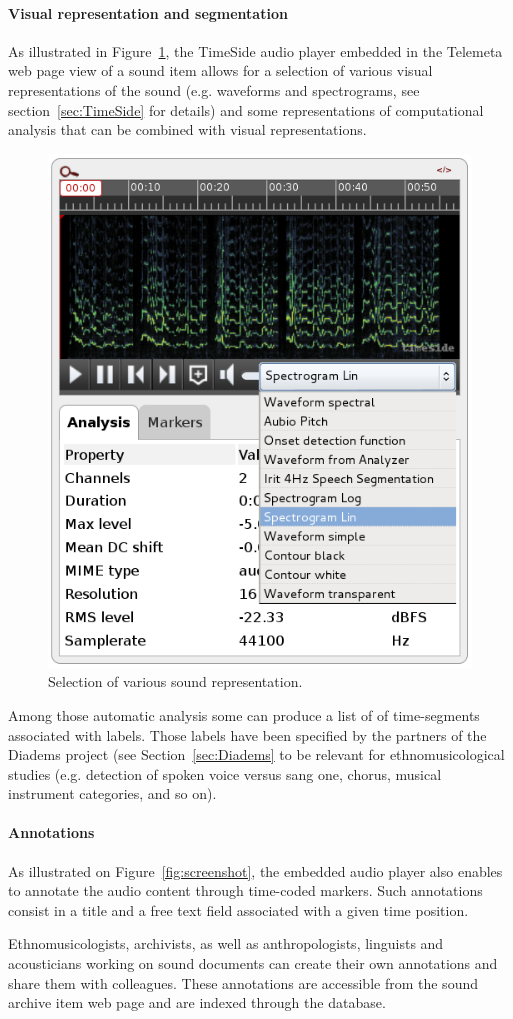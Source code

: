 \documentclass{sig-alternate}
\newcommand{\squeezeup}{\vspace{-2.5mm}}
\begin{document}
\squeezeup\paragraph{Visual representation and segmentation}
As illustrated in Figure~\ref{fig:sound_representation}, the TimeSide audio player embedded in the Telemeta web page view of a sound item allows for a selection of various visual representations of the sound (e.g. waveforms and spectrograms, see section~\ref{sec:TimeSide} for details) and some representations of computational analysis that can be combined with visual representations.
\begin{figure}[htb]
  \centering
  \includegraphics[width=0.5\linewidth]{img/sound_representation.png}
  \caption{Selection of various sound representation.}
  \label{fig:sound_representation}
\end{figure}
Among those automatic analysis some can produce a list of of time-segments associated with labels.
Those labels have been specified by the partners of the Diadems project (see Section~\ref{sec:Diadems} to be relevant for ethnomusicological studies (e.g. detection of spoken voice versus sang one, chorus, musical instrument categories, and so on).

\squeezeup\paragraph{Annotations}
As illustrated on Figure~\ref{fig:screenshot}, the embedded audio player also enables to annotate the audio content through time-coded markers.
Such annotations consist in a title and a free text field associated with a given time position.

Ethnomusicologists, archivists, as well as anthropologists, linguists and acousticians working on sound documents can create their own annotations and share them with colleagues. These annotations are accessible from the sound archive item web page and are indexed through the database.
\end{document}
